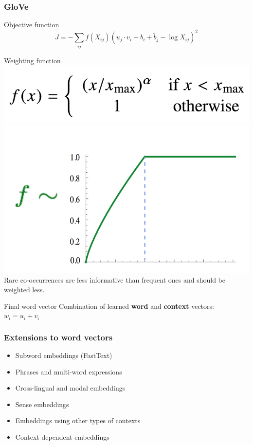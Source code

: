 \begin{frame}
\frametitle{GloVe}
\begin{alertblock}{Objective function}
\begin{equation*}
\hat{J} = - \sum_{ij} f(X_{ij})  ( u_j \cdot v_i + b_i + \tilde{b}_j - \log X_{ij} )^2 
\end{equation*}
\end{alertblock}
\pause
\begin{alertblock}{Weighting function}
\centering
\includegraphics[scale=0.12]{figures/wordvectors/glove-function-eq.png}
\includegraphics[scale=0.12]{figures/wordvectors/glove-function.png} \\
Rare co-occurrences are less informative than frequent ones and should be weighted less.
\end{alertblock}
\pause
\begin{alertblock}{Final word vector}
Combination of learned \textbf{word} and \textbf{context} vectors: \\
\centering
$w_i = u_i + v_i$
\end{alertblock}
\end{frame}


\begin{frame}
	\frametitle{Extensions to word vectors}
	\begin{itemize}[<+->]
		\item Subword embeddings (FastText)
		\item Phrases and multi-word expressions
		\item Cross-lingual and modal embeddings
		\item Sense embeddings
		\item Embeddings using other types of contexts
		\item Context dependent embeddings
	\end{itemize}
\end{frame}

